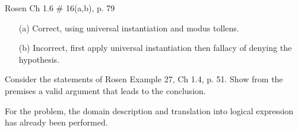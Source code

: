 \begin{questions}
 Rosen Ch 1.6 \# 16(a,b), p. 79
    \ifprintanswers
        \vspace{-15pt}
    \fi
\begin{solution}
    \begin{itemize}[itemsep=0pt,parsep=0pt,topsep=0pt,partopsep=0pt]
        \item[(a)] Correct, using universal instantiation and modus tollens.
        \item[(b)] Incorrect, first apply universal instantiation then fallacy of denying the hypothesis.
    \end{itemize}
\end{solution}



 Consider the statements of Rosen Example 27, Ch 1.4, p. 51.  Show from the premises a valid argument that leads to the conclusion.
    \ifprintanswers
        \vspace{-10pt}
    \fi
\begin{solution}
    For the problem, the domain description and translation into logical expression has already been performed.


\end{solution}
\end{questions}
